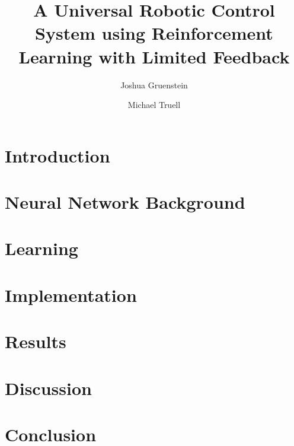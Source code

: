 \documentclass[letterpaper,11pt]{article}
\title{A Universal Robotic Control System using Reinforcement Learning with Limited Feedback}
\author{Joshua Gruenstein \and Michael Truell}
\begin{document}
\maketitle



\pagebreak

\section{Introduction}



\section{Neural Network Background}



\section{Learning}



\section{Implementation}



\section{Results}



\section{Discussion}



\section{Conclusion}



\nocite{gaskett,geoffrey,werbos,dini,macleod,dongsoo,dudek,watkins,rummery,baird}

\pagebreak


\end{document}
